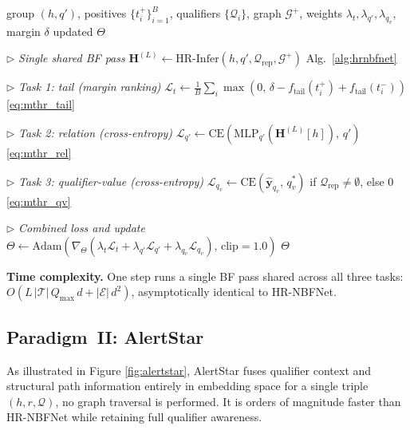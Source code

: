 \documentclass[10pt,journal,compsoc]{IEEEtran}
\begin{document}
\begin{algorithm}[t]
\caption{MT-HR-NBFNet: Training Step}
\label{alg:mthrnbfnet}
\begin{algorithmic}[1]
\Require group $(h, q')$, positives
  $\{t_i^+\}_{i=1}^{B}$,
  qualifiers $\{\mathcal{Q}_i\}$,
  graph $\mathcal{G}^+$,
  weights $\lambda_t, \lambda_{q'},
  \lambda_{q_v}$, margin $\delta$
\Ensure updated $\Theta$

\Statex \hfill $\triangleright$
  \textit{Single shared BF pass}
\State $\mathbf{H}^{(L)} \leftarrow
  \mathrm{HR\text{-}Infer}(h, q',
  \mathcal{Q}_{\mathrm{rep}},
  \mathcal{G}^+)$
  \hfill Alg.~\ref{alg:hrnbfnet}

\Statex \hfill $\triangleright$
  \textit{Task 1: tail (margin ranking)}
\State $\mathcal{L}_t \leftarrow
  \frac{1}{B}\sum_i \max(0,\, \delta
  - f_{\mathrm{tail}}(t_i^+)
  + f_{\mathrm{tail}}(t_i^-))$
  \hfill \eqref{eq:mthr_tail}

\Statex \hfill $\triangleright$
  \textit{Task 2: relation (cross-entropy)}
\State $\mathcal{L}_{q'} \leftarrow
  \mathrm{CE}(\mathrm{MLP}_{q'}(
  \mathbf{H}^{(L)}[h]),\, q')$
  \hfill \eqref{eq:mthr_rel}

\Statex \hfill $\triangleright$
  \textit{Task 3: qualifier-value (cross-entropy)}
\State $\mathcal{L}_{q_v} \leftarrow
  \mathrm{CE}(\hat{\mathbf{y}}_{q_v},\, q_v^*)$
  if $\mathcal{Q}_{\mathrm{rep}} \neq \emptyset$,
  else $0$
  \hfill \eqref{eq:mthr_qv}

\Statex \hfill $\triangleright$
  \textit{Combined loss and update}
\State $\Theta \leftarrow \mathrm{Adam}(
  \nabla_\Theta(\lambda_t \mathcal{L}_t
  + \lambda_{q'} \mathcal{L}_{q'}
  + \lambda_{q_v} \mathcal{L}_{q_v}),\,
  \mathrm{clip}{=}1.0)$
\State \Return $\Theta$
\end{algorithmic}
\end{algorithm}

\noindent\textbf{Time complexity.}
One step runs a single BF pass shared across all
three tasks:
$O(L\,|\mathcal{T}|\,Q_{\max}\,d
+ |\mathcal{E}|\,d^2)$,
asymptotically identical to HR-NBFNet.

\subsection{Paradigm~II: AlertStar}
\label{ssec:alertstar}
As illustrated in Figure \ref{fig:alertstar}, AlertStar fuses qualifier context and structural path
information entirely in embedding space for a single
triple $(h, r, \mathcal{Q})$, no graph traversal is
performed. It is orders of magnitude faster than
HR-NBFNet while retaining full qualifier awareness.
\end{document}
